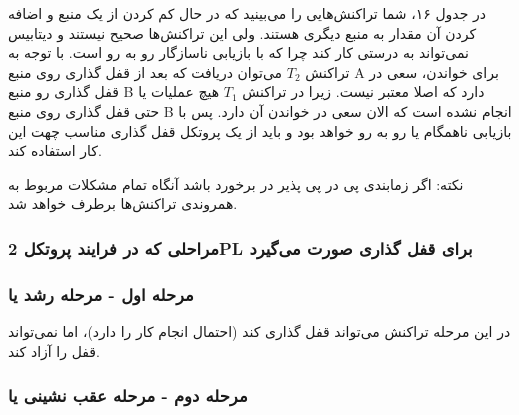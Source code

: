 \documentclass[a4paper]{article}
\begin{document}
\begin{LTR}
    \begin{table}[h]
        \begin{RTL}
            \caption{زمانبندی $S_{5}$}
        \end{RTL}
        \centering
    \end{table}
\end{LTR}

در جدول ۱۶، شما تراکنش‌هایی را می‌بینید که در حال کم کردن از یک منبع و اضافه
کردن آن مقدار به منبع دیگری هستند. ولی این تراکنش‌ها صحیح نیستند و دیتابیس
نمی‌تواند به درستی کار کند چرا که با بازیابی ناسازگار رو به رو است. با توجه به
تراکنش $T_{2}$ می‌توان دریافت که بعد از قفل گذاری روی منبع A برای خواندن، سعی در
قفل گذاری رو منبع B دارد که اصلا معتبر نیست. زیرا در تراکنش $T_{1}$ هیچ عملیات
یا حتی قفل گذاری روی منبع B انجام نشده است که الان سعی در خواندن آن دارد. پس با
بازیابی ناهمگام یا  رو به رو خواهد بود و باید از یک
پروتکل قفل گذاری مناسب چهت این کار استفاده کند.

نکته: اگر زمابندی پی در پی پذیر در برخورد باشد آنگاه تمام مشکلات مربوط به
همروندی تراکنش‌ها برطرف خواهد شد.

\subsubsection{مراحلی که در فرایند پروتکل 2PL برای قفل گذاری صورت می‌گیرد}

\subsubsection*{مرحله اول - مرحله رشد یا }

در این مرحله تراکنش می‌تواند قفل گذاری کند (احتمال انجام کار را دارد)، اما
نمی‌تواند قفل را آزاد کند.

\subsubsection*{مرحله دوم - مرحله عقب نشینی یا }
\end{document}
